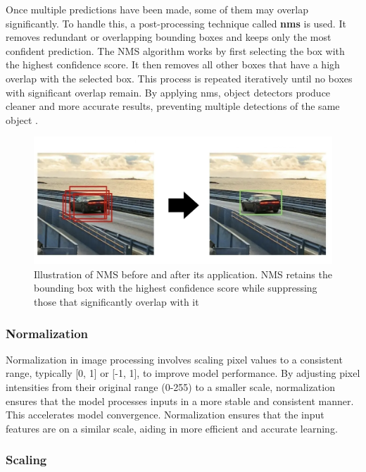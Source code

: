 Once multiple predictions have been made, some of them may overlap significantly. To handle this, a post-processing technique called \textbf{\gls{nms}} is used. It removes redundant or overlapping bounding boxes and keeps only the most confident prediction. The NMS algorithm works by first selecting the box with the highest confidence score. It then removes all other boxes that have a high overlap with the selected box. This process is repeated iteratively until no boxes with significant overlap remain. By applying \gls{nms}, object detectors produce cleaner and more accurate results, preventing multiple detections of the same object
\cite{thepythoncode:nms}.

\newpage

\begin{figure}[h!]
    \centering
    \includegraphics[width=0.75\linewidth]{figures/theory/image-recognition/nms.png}
    \caption[Non-maximum suppression (NMS) before and after applying the algorithm]{Illustration of NMS before and after its application. NMS retains the bounding box with the highest confidence score while suppressing those that significantly overlap with it \cite{thepythoncode:nms}}
    \label{fig:nms}
\end{figure}

\subsubsection*{Normalization}

Normalization in image processing involves scaling pixel values to a consistent range, typically [0, 1] or [-1, 1], to improve model performance. By adjusting pixel intensities from their original range (0-255) to a smaller scale, normalization ensures that the model processes inputs in a more stable and consistent manner. This accelerates model convergence. Normalization ensures that the input features are on a similar scale, aiding in more efficient and accurate learning.

\subsubsection*{Scaling}


